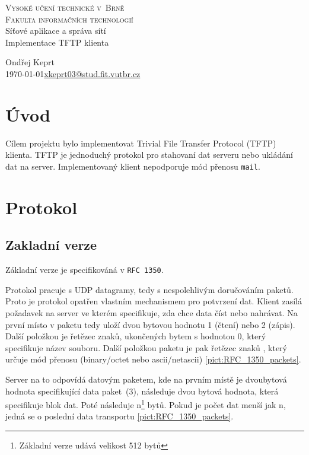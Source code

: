 \documentclass[11pt]{article}
\begin{document}
\begin{titlepage}
    \begin{center}    
        \textsc{\Huge{Vysoké učení technické v~Brně} \\[0.4em] \huge{Fakulta informačních technologií} }\\
        \LARGE{Síťové aplikace a správa sítí}\\
        \Huge{Implementace TFTP klienta}
    \end{center}
    {\Large\hfill Ondřej Keprt}\\
    {\Large \today \hfill \href{mailto:xkeprt03@stud.fit.vutbr.cz}{xkeprt03@stud.fit.vutbr.cz}}
\end{titlepage}

\newpage
\tableofcontents
\thispagestyle{empty}
\newpage
\setcounter{page}{1}

\section{Úvod}
Cílem projektu bylo implementovat Trivial File Transfer Protocol (TFTP) klienta. TFTP je jednoduchý protokol pro stahovaní dat serveru nebo ukládání dat na server.
Implementovaný klient nepodporuje mód přenosu \texttt{mail}.

\section{Protokol}
\subsection{Zakladní verze}
Základní verze je specifikováná v \texttt{RFC~1350}. \cite{revision2}

Protokol pracuje s UDP datagramy, tedy s nespolehlivým doručováním paketů. Proto je protokol opatřen vlastním mechanismem pro potvrzení dat.
Klient zasílá požadavek na server ve kterém specifikuje, zda chce data číst nebo nahrávat. Na první místo v paketu tedy uloží dvou bytovou 
hodnotu 1 (čtení) nebo 2 (zápis). Další položkou je řetězec znaků, ukončených bytem s hodnotou 0, který specifikuje název souboru. Další položkou paketu
je pak řetězec znaků , který určuje mód přenosu (binary/octet nebo ascii/netascii) \ref{pict:RFC_1350_packets}.

Server na to odpovídá datovým paketem, kde na prvním místě je dvoubytová hodnota specifikující data paket~(3), následuje dvou bytová hodnota,
která specifikuje blok dat. Poté následuje n\footnote{Základní verze udává velikost 512 bytů} bytů. Pokud je počet dat menší jak n, jedná se o poslední data transportu \ref{pict:RFC_1350_packets}.
\end{document}
